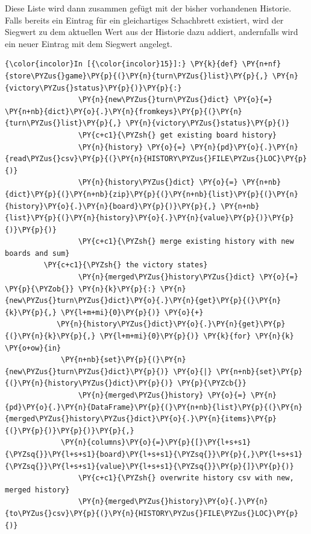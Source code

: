 Diese Liste wird dann zusammen gefügt mit der bisher vorhandenen
Historie. Falls bereits ein Eintrag für ein gleichartiges Schachbrett
existiert, wird der Siegwert zu dem aktuellen Wert aus der Historie dazu
addiert, andernfalls wird ein neuer Eintrag mit dem Siegwert angelegt.

    \begin{Verbatim}[commandchars=\\\{\}]
{\color{incolor}In [{\color{incolor}15}]:} \PY{k}{def} \PY{n+nf}{store\PYZus{}game}\PY{p}{(}\PY{n}{turn\PYZus{}list}\PY{p}{,} \PY{n}{victory\PYZus{}status}\PY{p}{)}\PY{p}{:}
                 \PY{n}{new\PYZus{}turn\PYZus{}dict} \PY{o}{=} \PY{n+nb}{dict}\PY{o}{.}\PY{n}{fromkeys}\PY{p}{(}\PY{n}{turn\PYZus{}list}\PY{p}{,} \PY{n}{victory\PYZus{}status}\PY{p}{)}
                 \PY{c+c1}{\PYZsh{} get existing board history}
                 \PY{n}{history} \PY{o}{=} \PY{n}{pd}\PY{o}{.}\PY{n}{read\PYZus{}csv}\PY{p}{(}\PY{n}{HISTORY\PYZus{}FILE\PYZus{}LOC}\PY{p}{)}
                 \PY{n}{history\PYZus{}dict} \PY{o}{=} \PY{n+nb}{dict}\PY{p}{(}\PY{n+nb}{zip}\PY{p}{(}\PY{n+nb}{list}\PY{p}{(}\PY{n}{history}\PY{o}{.}\PY{n}{board}\PY{p}{)}\PY{p}{,} \PY{n+nb}{list}\PY{p}{(}\PY{n}{history}\PY{o}{.}\PY{n}{value}\PY{p}{)}\PY{p}{)}\PY{p}{)}
                 \PY{c+c1}{\PYZsh{} merge existing history with new boards and sum} 
		 \PY{c+c1}{\PYZsh{} the victory states}
                 \PY{n}{merged\PYZus{}history\PYZus{}dict} \PY{o}{=} \PY{p}{\PYZob{}} \PY{n}{k}\PY{p}{:} \PY{n}{new\PYZus{}turn\PYZus{}dict}\PY{o}{.}\PY{n}{get}\PY{p}{(}\PY{n}{k}\PY{p}{,} \PY{l+m+mi}{0}\PY{p}{)} \PY{o}{+}
 			\PY{n}{history\PYZus{}dict}\PY{o}{.}\PY{n}{get}\PY{p}{(}\PY{n}{k}\PY{p}{,} \PY{l+m+mi}{0}\PY{p}{)} \PY{k}{for} \PY{n}{k} \PY{o+ow}{in} 
			 \PY{n+nb}{set}\PY{p}{(}\PY{n}{new\PYZus{}turn\PYZus{}dict}\PY{p}{)} \PY{o}{|} \PY{n+nb}{set}\PY{p}{(}\PY{n}{history\PYZus{}dict}\PY{p}{)} \PY{p}{\PYZcb{}}
                 \PY{n}{merged\PYZus{}history} \PY{o}{=} \PY{n}{pd}\PY{o}{.}\PY{n}{DataFrame}\PY{p}{(}\PY{n+nb}{list}\PY{p}{(}\PY{n}{merged\PYZus{}history\PYZus{}dict}\PY{o}{.}\PY{n}{items}\PY{p}{(}\PY{p}{)}\PY{p}{)}\PY{p}{,} 
			 \PY{n}{columns}\PY{o}{=}\PY{p}{[}\PY{l+s+s1}{\PYZsq{}}\PY{l+s+s1}{board}\PY{l+s+s1}{\PYZsq{}}\PY{p}{,}\PY{l+s+s1}{\PYZsq{}}\PY{l+s+s1}{value}\PY{l+s+s1}{\PYZsq{}}\PY{p}{]}\PY{p}{)}
                 \PY{c+c1}{\PYZsh{} overwrite history csv with new, merged history}
                 \PY{n}{merged\PYZus{}history}\PY{o}{.}\PY{n}{to\PYZus{}csv}\PY{p}{(}\PY{n}{HISTORY\PYZus{}FILE\PYZus{}LOC}\PY{p}{)}
\end{Verbatim}


